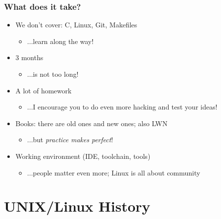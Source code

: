 \documentclass[aspectratio=169]{beamer}
\begin{document}
\begin{frame}
  \frametitle{What does it take?}
  \begin{itemize}

    \item We don't cover: C, Linux, Git, Makefiles
    \begin{itemize}
      \item ...learn along the way!
    \end{itemize}

    \pause
    \item 3 months
    \begin{itemize}
      \item ...is not too long!
    \end{itemize}

    \pause
    \item A lot of homework
    \begin{itemize}
      \item ...I encourage you to do even more hacking and test your ideas!
    \end{itemize}

    \pause
    \item Books: there are old ones and new ones; also LWN
    \begin{itemize}
      \item ...but \textit{practice makes perfect}!
    \end{itemize}

    \pause
    \item Working environment (IDE, toolchain, tools)
    \begin{itemize}
      \item ...people matter even more; Linux is all about community
    \end{itemize}
  \end{itemize}
\end{frame}

\section{UNIX/Linux History}
\end{document}
